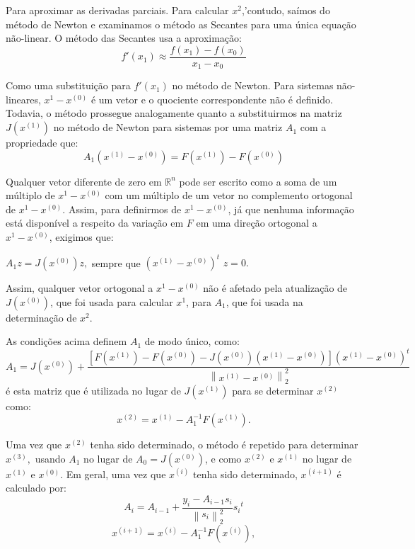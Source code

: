 \documentclass[
	12pt,				%
	oneside,			%
	a4paper,			%
	english,			%
	french,				%
	spanish,			%
	brazil				%
	]{abntex2}
\begin{document}
Para aproximar as derivadas parciais. Para calcular $x^{2}$,'contudo, saímos do método de Newton e examinamos o método as Secantes para uma única equação não-linear. O método das Secantes usa a aproximação:
$$f'(x_1)\approx\dfrac{f\left(x_1\right)-f\left(x_0\right)}{x_1-x_0}$$

Como uma substituição para $f'\left(x_1\right)$ no método de Newton. Para sistemas não-lineares, $x^{1}-x^{(0)}$ é um vetor e o quociente correspondente não é definido. Todavia, o método prossegue analogamente quanto a substituirmos na matriz $J\left(x^{(1)}\right)$ no método de Newton para sistemas por uma matriz $A_1$ com a propriedade que:
$$A_1\left(x^{\left(1\right)}-x^{\left(0\right)}\right)=F\left(x^{\left(1\right)}
\right)-F\left(x^{\left(0\right)}\right)$$

Qualquer vetor diferente de zero em ${\mathbb{R}}^n$ pode ser escrito como a soma de um múltiplo de $x^{1}-x^{(0)}$ com um múltiplo de um vetor no complemento ortogonal de $x^{1}-x^{(0)}$. Assim, para definirmos de $x^{1}-x^{\left(0\right)}$, já que nenhuma informação está disponível a respeito da variação em $F$ em uma direção ortogonal a $x^{1}-x^{(0)}$, exigimos que:
\begin{center}
$A_1z=J\left(x^{(0)}\right)z,$ sempre que ${\left(x^{(1)}-x^{\left(0\right)}\right)}^t$ $z=0.$ 
\end{center}

Assim, qualquer vetor ortogonal a $x^{1}-x^{(0)}$ não é afetado pela atualização de $J\left(x^{(0)}\right)$, que foi usada para calcular $x^{1}$, para $A_1$, que foi usada na determinação de $x^{2}$.

As condições acima definem $A_1$ de modo único, como:
$$A_1=J\left(x^{(0)}\right)+\dfrac{\left[F\left(x^{\left(1\right)}\right)-F\left(x^{\left(0\right)}\right)-J\left(x^{\left(0\right)}\right)\left(x^{\left(1\right)}-x^{\left(0\right)}\right)\right]{\left(x^{(1)}-x^{\left(0\right)}\right)}^t}{{\left\|x^{(1)}-x^{\left(0\right)}\right\|}^2_2}$$
é esta matriz que é utilizada no lugar de $J\left(x^{\left(1\right)}\right)$ para se determinar $x^{\left(2\right)}$ como:
$$x^{\left(2\right)}=x^{\left(1\right)}-A^{-1}_1F\left(x^{\left(1\right)}\right).$$

Uma vez que $x^{\left(2\right)}$ tenha sido determinado, o método é repetido para determinar $x^{\left(3\right)},$ usando $A_1$ no lugar de $A_0=J\left(x^{\left(0\right)}\right)$, e como $x^{\left(2\right)}$ e $x^{\left(1\right)}$ no lugar de $x^{\left(1\right)}$ e $x^{\left(0\right)}$. Em geral, uma vez que $x^{\left(i\right)}$ tenha sido determinado, $x^{\left(i+1\right)}$ é calculado por:
$$A_i=A_{i-1}+\dfrac{y_i-A_{i-1}s_i}{{\left\|s_i\right\|}^2_2}{s_i}^t$$ $$x^{\left(i+1\right)}=x^{\left(i\right)}-A^{-1}_1F\left(x^{\left(i\right)}\right),$$
\end{document}
